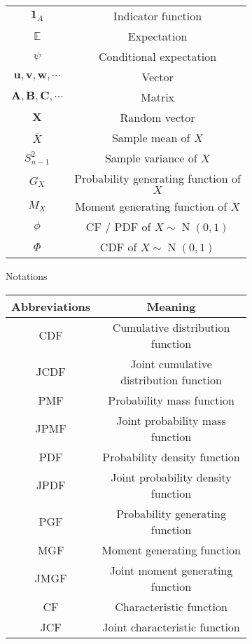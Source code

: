 \documentclass{huhtakm-template-book-v2}
\DeclareMathOperator{\N}{N}
\begin{document}
\begin{figure}[h]
\begin{subfigure}[h]{0.45\textwidth}
\begin{tabular}{cc}
                $\mathbf{1}_{A}$ & Indicator function\\
                $\mathbb{E}$ & Expectation\\
                $\psi$ & Conditional expectation\\
                $\mathbf{u},\mathbf{v},\mathbf{w},\cdots$ & Vector\\
                $\mathbf{A},\mathbf{B},\mathbf{C},\cdots$ & Matrix\\
                $\mathbf{X}$ & Random vector\\
                $\overline{X}$ & Sample mean of $X$\\
                $S_{n-1}^{2}$ & Sample variance of $X$\\
                $G_{X}$ & Probability generating function of $X$\\
                $M_{X}$ & Moment generating function of $X$\\
                $\phi$ & CF / PDF of $X \sim \N(0,1)$\\
                $\Phi$ & CDF of $X \sim \N(0,1)$
            \end{tabular}
            \caption{Notations}
        \end{subfigure}
        \begin{subfigure}[h]{0.45\textwidth}
            \centering
            \begin{tabular}{cc}
                Abbreviations & Meaning\\
                \hline
                CDF & Cumulative distribution function\\
                JCDF & Joint cumulative distribution function\\
                PMF & Probability mass function\\
                JPMF & Joint probability mass function\\
                PDF & Probability density function\\
                JPDF & Joint probability density function\\
                PGF & Probability generating function\\
                MGF & Moment generating function\\
                JMGF & Joint moment generating function\\
                CF & Characteristic function\\
                JCF & Joint characteristic function\\

\end{tabular}
\end{subfigure}
\end{figure}
\end{document}
